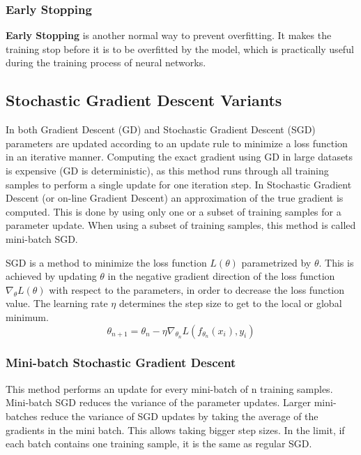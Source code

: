     \subsubsection{Early Stopping}
    \textbf{Early Stopping} is another normal way to prevent overfitting. 
    It makes the training stop before it is to be overfitted by the model, which is practically useful during the training process of neural networks.


    \subsection{Stochastic Gradient Descent Variants}
    \label{sgd}
    In both Gradient Descent (GD) and Stochastic Gradient Descent (SGD) parameters are updated according to an update rule to minimize a loss function in an iterative manner. Computing the exact gradient using GD in large datasets is expensive (GD is deterministic), as this method runs through all training samples to perform a single update for one iteration step. In Stochastic Gradient Descent (or on-line Gradient Descent) an approximation of the true gradient is computed. This is done by using only one or a subset of training samples for a parameter update. When using a subset of training samples, this method is called mini-batch SGD. 

    SGD is a method to minimize the loss function \(L(\theta)\)  parametrized by $\theta$. This is achieved by updating $\theta$ in the negative gradient direction of the loss function $\nabla_{\theta}L(\theta)$ with respect to the parameters, in order to decrease the loss function value. The learning rate $\eta$ determines the step size to get to the local or global minimum. 
    \begin{equation}
        \theta_{n+1} = \theta_{n} - \eta \nabla_{\theta_{n}}L(f_{\theta_{n}}(x_i), y_i)
    \end{equation}

    \subsubsection{Mini-batch Stochastic Gradient Descent}
    This method performs an update for every mini-batch of n training samples. Mini-batch SGD reduces the variance of the parameter updates. Larger mini-batches reduce the variance of SGD updates by taking the average of the gradients in the mini batch. This allows taking bigger step sizes. In the limit, if each batch contains one training sample, it is the same as regular SGD.

